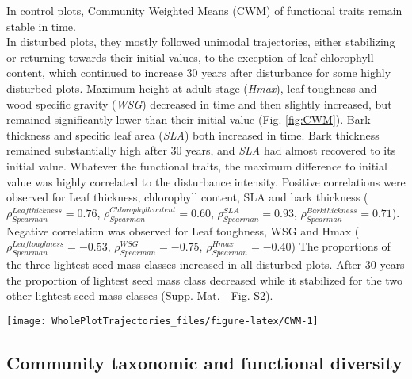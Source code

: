 \documentclass[fleqn,10pt]{ArtEcoFoG} %
\begin{document}
In control plots, Community Weighted Means (CWM) of functional traits
remain stable in time.\\
In disturbed plots, they mostly followed unimodal trajectories, either
stabilizing or returning towards their initial values, to the exception
of leaf chlorophyll content, which continued to increase 30 years after
disturbance for some highly disturbed plots. Maximum height at adult
stage (\emph{Hmax}), leaf toughness and wood specific gravity
(\emph{WSG}) decreased in time and then slightly increased, but remained
significantly lower than their initial value (Fig. \ref{fig:CWM}). Bark
thickness and specific leaf area (\emph{SLA}) both increased in time.
Bark thickness remained substantially high after 30 years, and
\emph{SLA} had almost recovered to its initial value. Whatever the
functional traits, the maximum difference to initial value was highly
correlated to the disturbance intensity. Positive correlations were
observed for Leaf thickness, chlorophyll content, SLA and bark thickness
(\(\rho_{Spearman}^{Leaf thickness}=0.76\),
\(\rho_{Spearman}^{Chlorophyll content}=0.60\),
\(\rho_{Spearman}^{SLA}=0.93\),
\(\rho_{Spearman}^{Bark thickness}=0.71\)). Negative correlation was
observed for Leaf toughness, WSG and Hmax
(\(\rho_{Spearman}^{Leaf toughness}=-0.53\),
\(\rho_{Spearman}^{WSG}=-0.75\), \(\rho_{Spearman}^{Hmax}=-0.40\)) The
proportions of the three lightest seed mass classes increased in all
disturbed plots. After 30 years the proportion of lightest seed mass
class decreased while it stabilized for the two other lightest seed mass
classes (Supp. Mat. - Fig. S2).

\begin{figure*}

{\centering \texttt{[image: WholePlotTrajectories\_files/figure-latex/CWM-1]} 

}

\caption{Trajectories of community weighted means over 30 years after disturbance of four leaf traits (Leaf thickness, chlorophyll content, toughness, and specific area), two stem traits (wood specific gravity, and bark thickness) and one life history trait (Specific maximum height at adult stage). }\label{fig:CWM}
\end{figure*}

\subsection{Community taxonomic and functional
diversity}\label{community-taxonomic-and-functional-diversity}
\end{document}

